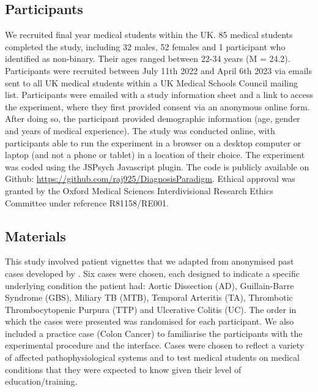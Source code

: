 \documentclass[a4paper, nobind]{templates/ociamthesis}
\begin{document}
\subsection*{Participants}\label{participants}

We recruited final year medical students within the UK. 85 medical students completed the study, including 32 males, 52 females and 1 participant who identified as non-binary. Their ages ranged between 22-34 years (M = 24.2). Participants were recruited between July 11th 2022 and April 6th 2023 via emails sent to all UK medical students within a UK Medical Schools Council mailing list. Participants were emailed with a study information sheet and a link to access the experiment, where they first provided consent via an anonymous online form. After doing so, the participant provided demographic information (age, gender and years of medical experience). The study was conducted online, with participants able to run the experiment in a browser on a desktop computer or laptop (and not a phone or tablet) in a location of their choice. The experiment was coded using the JSPsych Javascript plugin. The code is publicly available on Github: \url{https://github.com/raj925/DiagnosisParadigm}. Ethical approval was granted by the Oxford Medical Sciences Interdivisional Research Ethics Committee under reference R81158/RE001.

\subsection*{Materials}\label{materials}

This study involved patient vignettes that we adapted from anonymised past cases developed by \textcite{friedman_are_2001}. Six cases were chosen, each designed to indicate a specific underlying condition the patient had: Aortic Dissection (AD), Guillain-Barre Syndrome (GBS), Miliary TB (MTB), Temporal Arteritis (TA), Thrombotic Thrombocytopenic Purpura (TTP) and Ulcerative Colitis (UC). The order in which the cases were presented was randomised for each participant. We also included a practice case (Colon Cancer) to familiarise the participants with the experimental procedure and the interface. Cases were chosen to reflect a variety of affected pathophysiological systems and to test medical students on medical conditions that they were expected to know given their level of education/training.\\
\end{document}
